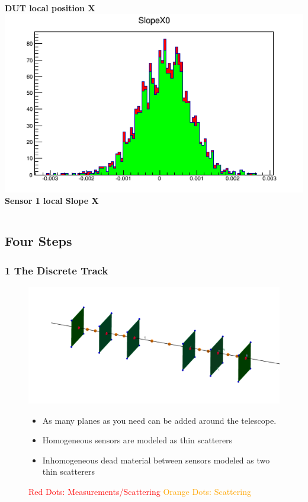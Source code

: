 \documentclass{beamer}
\begin{document}
\begin{frame}
\begin{columns}[t]
\tiny{\textbf{DUT local position X}} \\
\includegraphics[width=0.8\linewidth]{pics/slope1X.png}\\ 
\tiny{\textbf{Sensor 1 local Slope X}} \\
\end{columns}
\vspace{5pt}
\end{frame}

\subsection{Four Steps}
\begin{frame}
\frametitle{\textbf{1} The Discrete Track}
\begin{figure}
\label{Scat}
\includegraphics[scale=0.50]{pics/meas-scat-jac-link.png}
\caption{
\tiny{
\textcolor{red}{Red Dots: Measurements/Scattering} \textcolor{orange}{Orange Dots: Scattering}
}
}
\begin{itemize}
\item As many planes as you need can be added around the telescope.
\item Homogeneous sensors are modeled as thin scatterers
\item Inhomogeneous dead material between sensors modeled as two thin scatterers 
\end{itemize}

\end{figure}
\end{frame}
\end{document}
